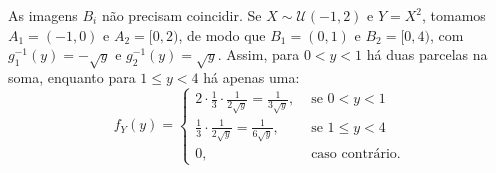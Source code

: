 \begin{obs:transformacao nao monotona}
As imagens $B_i$ não precisam coincidir.
Se $X \sim \mathcal{U}(-1, 2)$ e $Y = X^2$, tomamos $A_1 = (-1, 0)$ e $A_2 = [0, 2)$, de
modo que $B_1 = (0, 1)$ e $B_2 = [0, 4)$, com $g_1^{-1}(y) = -\sqrt y$ e
$g_2^{-1}(y) = \sqrt y$.
Assim, para $0 < y < 1$ há duas parcelas na soma, enquanto para $1 \le y < 4$ há apenas
uma:
\[
	f_Y(y) = \begin{cases}
		2 \cdot \frac 1 3 \cdot \frac{1}{2\sqrt y} = \frac{1}{3\sqrt y}, & \text{ se } 0 < y < 1 \\
		\frac 1 3 \cdot \frac{1}{2\sqrt y} = \frac{1}{6\sqrt y},       & \text{ se } 1 \le y < 4 \\
		0,                                                             & \text{ caso contrário.}
	\end{cases}
\]
\end{obs:transformacao nao monotona}
